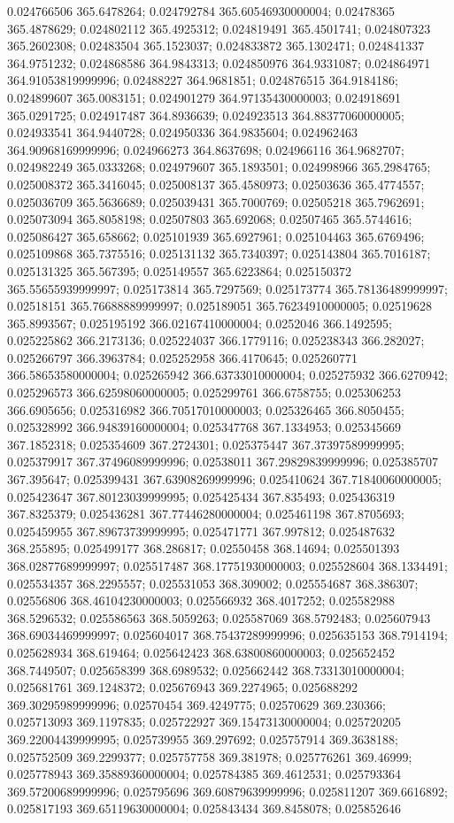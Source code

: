 0.024766506 365.6478264; 0.024792784 365.60546930000004; 0.02478365 365.4878629; 0.024802112 365.4925312; 0.024819491 365.4501741; 0.024807323 365.2602308; 0.02483504 365.1523037; 0.024833872 365.1302471; 0.024841337 364.9751232; 0.024868586 364.9843313; 0.024850976 364.9331087; 0.024864971 364.91053819999996; 0.02488227 364.9681851; 0.024876515 364.9184186; 0.024899607 365.0083151; 0.024901279 364.97135430000003; 0.024918691 365.0291725; 0.024917487 364.8936639; 0.024923513 364.88377060000005; 0.024933541 364.9440728; 0.024950336 364.9835604; 0.024962463 364.90968169999996; 0.024966273 364.8637698; 0.024966116 364.9682707; 0.024982249 365.0333268; 0.024979607 365.1893501; 0.024998966 365.2984765; 0.025008372 365.3416045; 0.025008137 365.4580973; 0.02503636 365.4774557; 0.025036709 365.5636689; 0.025039431 365.7000769; 0.02505218 365.7962691; 0.025073094 365.8058198; 0.02507803 365.692068; 0.02507465 365.5744616; 0.025086427 365.658662; 0.025101939 365.6927961; 0.025104463 365.6769496; 0.025109868 365.7375516; 0.025131132 365.7340397; 0.025143804 365.7016187; 0.025131325 365.567395; 0.025149557 365.6223864; 0.025150372 365.55655939999997; 0.025173814 365.7297569; 0.025173774 365.78136489999997; 0.02518151 365.76688889999997; 0.025189051 365.76234910000005; 0.02519628 365.8993567; 0.025195192 366.02167410000004; 0.0252046 366.1492595; 0.025225862 366.2173136; 0.025224037 366.1779116; 0.025238343 366.282027; 0.025266797 366.3963784; 0.025252958 366.4170645; 0.025260771 366.58653580000004; 0.025265942 366.63733010000004; 0.025275932 366.6270942; 0.025296573 366.62598060000005; 0.025299761 366.6758755; 0.025306253 366.6905656; 0.025316982 366.70517010000003; 0.025326465 366.8050455; 0.025328992 366.94839160000004; 0.025347768 367.1334953; 0.025345669 367.1852318; 0.025354609 367.2724301; 0.025375447 367.37397589999995; 0.025379917 367.37496089999996; 0.02538011 367.29829839999996; 0.025385707 367.395647; 0.025399431 367.63908269999996; 0.025410624 367.71840060000005; 0.025423647 367.80123039999995; 0.025425434 367.835493; 0.025436319 367.8325379; 0.025436281 367.77446280000004; 0.025461198 367.8705693; 0.025459955 367.89673739999995; 0.025471771 367.997812; 0.025487632 368.255895; 0.025499177 368.286817; 0.02550458 368.14694; 0.025501393 368.02877689999997; 0.025517487 368.17751930000003; 0.025528604 368.1334491; 0.025534357 368.2295557; 0.025531053 368.309002; 0.025554687 368.386307; 0.02556806 368.46104230000003; 0.025566932 368.4017252; 0.025582988 368.5296532; 0.025586563 368.5059263; 0.025587069 368.5792483; 0.025607943 368.69034469999997; 0.025604017 368.75437289999996; 0.025635153 368.7914194; 0.025628934 368.619464; 0.025642423 368.63800860000003; 0.025652452 368.7449507; 0.025658399 368.6989532; 0.025662442 368.73313010000004; 0.025681761 369.1248372; 0.025676943 369.2274965; 0.025688292 369.30295989999996; 0.02570454 369.4249775; 0.02570629 369.230366; 0.025713093 369.1197835; 0.025722927 369.15473130000004; 0.025720205 369.22004439999995; 0.025739955 369.297692; 0.025757914 369.3638188; 0.025752509 369.2299377; 0.025757758 369.381978; 0.025776261 369.46999; 0.025778943 369.35889360000004; 0.025784385 369.4612531; 0.025793364 369.57200689999996; 0.025795696 369.60879639999996; 0.025811207 369.6616892; 0.025817193 369.65119630000004; 0.025843434 369.8458078; 0.025852646 